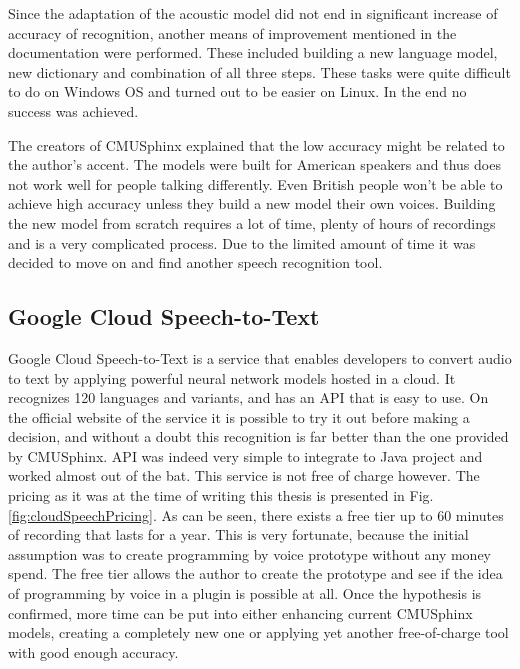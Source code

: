 Since the adaptation of the acoustic model did not end in significant increase of accuracy of recognition, another means of improvement mentioned in the documentation were performed. These included building a new language model, new dictionary and combination of all three steps. These tasks were quite difficult to do on Windows OS and turned out to be easier on Linux. In the end no success was achieved.

The creators of CMUSphinx explained that the low accuracy might be related to the author's accent. The models were built for American speakers and thus does not work well for people talking differently. Even British people won't be able to achieve high accuracy unless they build a new model their own voices. Building the new model from scratch requires a lot of time, plenty of hours of recordings and is a very complicated process. Due to the limited amount of time it was decided to move on and find another speech recognition tool. 

\subsection{Google Cloud Speech-to-Text}

Google Cloud Speech-to-Text is a service that enables developers to convert audio to text by applying powerful neural network models hosted in a cloud. It recognizes 120 languages and variants, and has an API that is easy to use. On the official website of the service it is possible to try it out before making a decision, and without a doubt this recognition is far better than the one provided by CMUSphinx. API was indeed very simple to integrate to Java project and worked almost out of the bat. This service is not free of charge however. The pricing as it was at the time of writing this thesis is presented in Fig. \ref{fig:cloudSpeechPricing}. As can be seen, there exists a free tier up to 60 minutes of recording that lasts for a year. This is very fortunate, because the initial assumption was to create programming by voice prototype without any money spend. The free tier allows the author to create the prototype and see if the idea of programming by voice in a plugin is possible at all. Once the hypothesis is confirmed, more time can be put into either enhancing current CMUSphinx models, creating a completely new one or applying yet another free-of-charge tool with good enough accuracy.

